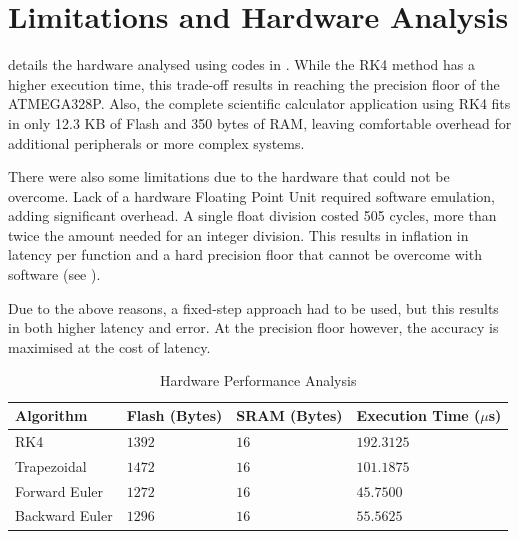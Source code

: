 \documentclass[conference]{IEEEtran}
\newcommand{\rev}[1]{{\color{black}#1}}
\begin{document}
\section{\rev{Limitations and Hardware Analysis}}
\rev{
 details the hardware analysed using codes in \appref{app:codes}.
While the RK4 method has a higher execution time, this trade-off results in reaching the precision floor of the ATMEGA328P. Also, the complete scientific calculator application using RK4 fits in only 12.3 KB of Flash and 350 bytes of RAM, leaving comfortable overhead for additional peripherals or more complex systems.

There were also some limitations due to the hardware that could not be overcome.
Lack of a hardware Floating Point Unit required software emulation, adding significant overhead. A single float division costed 505 cycles, more than twice the amount needed for an integer division. This results in inflation in latency per function and a hard precision floor that cannot be overcome with software (see \appref{app:new_anal}).
\par Due to the above reasons, a fixed-step approach had to be used, but this results in both higher latency and error. At the precision floor however, the accuracy is maximised at the cost of latency.
}

\begin{table}[H]
    \centering
    \caption{\rev{Hardware Performance Analysis}}
    \label{tab:hardware_results}
    \begin{tabularx}{\columnwidth}{X X X X}
        \toprule
        \textbf{Algorithm} & \textbf{Flash (Bytes)} & \textbf{SRAM (Bytes)} & \textbf{Execution Time ($\mu$s)} \\
        \midrule
        RK4 & $1392$ & $16$ & $192.3125$\\
        Trapezoidal & $1472$ & $16$ & $101.1875$ \\
        Forward Euler & $1272$ & $16$ & $45.7500$ \\
        Backward Euler & $1296$ & $16$ & $55.5625$ \\
        \bottomrule
    \end{tabularx}
\end{table}

\end{document}
